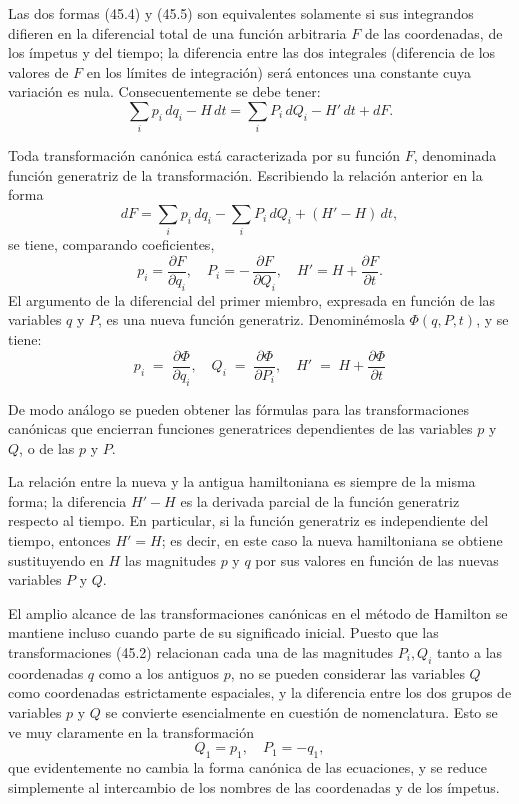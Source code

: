 \documentclass[12pt]{article}
\begin{document}
Las dos formas (45.4) y (45.5) son equivalentes solamente si sus integrandos difieren en la diferencial total de una función arbitraria \(F\) de las coordenadas, de los ímpetus y del tiempo; la diferencia entre las dos integrales (diferencia de los valores de \(F\) en los límites de integración) será entonces una constante cuya variación es nula. Consecuentemente se debe tener:
\[
\sum_i p_i\,dq_i - H\,dt
= \sum_i P_i\,dQ_i - H'\,dt + dF.
\tag{45.6}
\]

Toda transformación canónica está caracterizada por su función \(F\), denominada función generatriz de la transformación. Escribiendo la relación anterior en la forma
\[
dF = \sum_i p_i\,dq_i - \sum_i P_i\,dQ_i + (H' - H)\,dt,
\tag{45.6$'$}
\]
se tiene, comparando coeficientes,
\[
p_i = \frac{\partial F}{\partial q_i},
\quad
P_i = -\,\frac{\partial F}{\partial Q_i},
\quad
H' = H + \frac{\partial F}{\partial t}.
\tag{45.7}
\] 
\noindent El argumento de la diferencial del primer miembro, expresada en función de las variables \(q\) y \(P\), es una nueva función generatriz. Denominémosla \(\Phi(q,P,t)\), y se tiene:
\begin{equation}
p_i \;=\;\frac{\partial\Phi}{\partial q_i},\quad
Q_i \;=\;\frac{\partial\Phi}{\partial P_i},\quad
H' \;=\;H + \frac{\partial\Phi}{\partial t}\tag{45.8}
\end{equation}

De modo análogo se pueden obtener las fórmulas para las transformaciones canónicas que encierran funciones generatrices dependientes de las variables \(p\) y \(Q\), o de las \(p\) y \(P\).

La relación entre la nueva y la antigua hamiltoniana es siempre de la misma forma; la diferencia \(H'-H\) es la derivada parcial de la función generatriz respecto al tiempo. En particular, si la función generatriz es independiente del tiempo, entonces \(H'=H\); es decir, en este caso la nueva hamiltoniana se obtiene sustituyendo en \(H\) las magnitudes \(p\) y \(q\) por sus valores en función de las nuevas variables \(P\) y \(Q\).

El amplio alcance de las transformaciones canónicas en el método de Hamilton se mantiene incluso cuando parte de su significado inicial. Puesto que las transformaciones (45.2) relacionan cada una de las magnitudes \(P_i, Q_i\) tanto a las coordenadas \(q\) como a los antiguos \(p\), no se pueden considerar las variables \(Q\) como coordenadas estrictamente espaciales, y la diferencia entre los dos grupos de variables \(p\) y \(Q\) se convierte esencialmente en cuestión de nomenclatura. Esto se ve muy claramente en la transformación
\[
Q_1 = p_1,\quad P_1 = -q_1,
\]
que evidentemente no cambia la forma canónica de las ecuaciones, y se reduce simplemente al intercambio de los nombres de las coordenadas y de los ímpetus.
\end{document}
